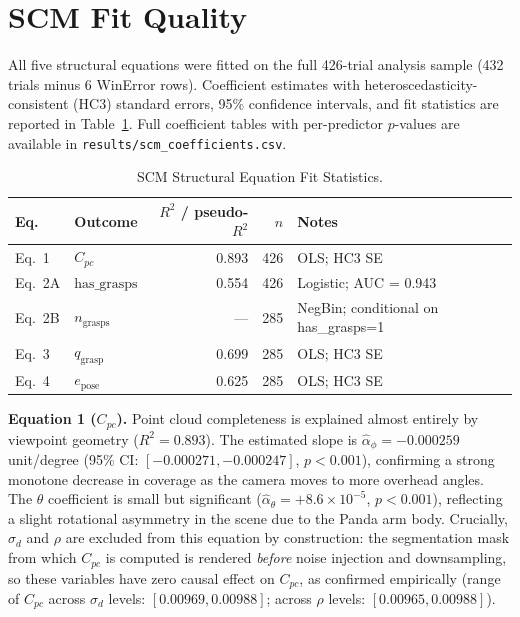 \documentclass[11pt,a4paper]{report}
\begin{document}
\section{SCM Fit Quality}
\label{sec:scm_fit}

All five structural equations were fitted on the full 426-trial analysis sample (432 trials minus 6 WinError rows). Coefficient estimates with heteroscedasticity-consistent (HC3) standard errors, 95\% confidence intervals, and fit statistics are reported in Table~\ref{tab:scm_fit}. Full coefficient tables with per-predictor $p$-values are available in \texttt{results/scm\_coefficients.csv}.

\begin{table}[t]
  \caption{SCM Structural Equation Fit Statistics.}
  \label{tab:scm_fit}
  \centering
  \begin{tabular}{llrrl}
    \toprule
    \textbf{Eq.} & \textbf{Outcome} & \textbf{$R^2$ / pseudo-$R^2$} & \textbf{$n$} & \textbf{Notes} \\
    \midrule
    Eq.~1 & $C_{pc}$       & 0.893 & 426 & OLS; HC3 SE \\
    Eq.~2A & $\text{has\_grasps}$ & 0.554 & 426 & Logistic; AUC = 0.943 \\
    Eq.~2B & $n_{\text{grasps}}$  & ---   & 285 & NegBin; conditional on has\_grasps=1 \\
    Eq.~3  & $q_{\text{grasp}}$  & 0.699 & 285 & OLS; HC3 SE \\
    Eq.~4  & $e_{\text{pose}}$   & 0.625 & 285 & OLS; HC3 SE \\
    \bottomrule
  \end{tabular}
\end{table}

\textbf{Equation 1 ($C_{pc}$).} Point cloud completeness is explained almost entirely by viewpoint geometry ($R^2 = 0.893$). The estimated slope is $\hat{\alpha}_{\phi} = -0.000259$\,unit/degree (95\% CI: $[-0.000271, -0.000247]$, $p < 0.001$), confirming a strong monotone decrease in coverage as the camera moves to more overhead angles. The $\theta$ coefficient is small but significant ($\hat{\alpha}_{\theta} = +8.6 \times 10^{-5}$, $p < 0.001$), reflecting a slight rotational asymmetry in the scene due to the Panda arm body. Crucially, $\sigma_d$ and $\rho$ are excluded from this equation by construction: the segmentation mask from which $C_{pc}$ is computed is rendered \emph{before} noise injection and downsampling, so these variables have zero causal effect on $C_{pc}$, as confirmed empirically (range of $C_{pc}$ across $\sigma_d$ levels: $[0.00969, 0.00988]$; across $\rho$ levels: $[0.00965, 0.00988]$).
\end{document}
